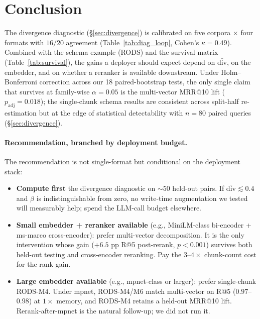 \documentclass[11pt]{article}
\begin{document}
\section{Conclusion}
\label{sec:conclusion}

The divergence diagnostic (\S\ref{sec:divergence}) is calibrated on
five corpora $\times$ four formats with $16/20$ agreement
(Table~\ref{tab:diag_loop}, Cohen's $\kappa{=}0.49$). Combined with
the schema example (RODS) and the survival matrix
(Table~\ref{tab:survival}), the gains a deployer should expect
depend on $\bar{\mathrm{div}}$, on the embedder, and on whether a
reranker is available downstream. Under Holm--Bonferroni correction
across our 18 paired-bootstrap tests, the only single claim that
survives at family-wise $\alpha=0.05$ is the multi-vector MRR@10
lift ($p_{\text{adj}}=0.018$); the single-chunk schema results are
consistent across split-half re-estimation but at the edge of
statistical detectability with $n{=}80$ paired queries
(\S\ref{sec:divergence}).

\paragraph{Recommendation, branched by deployment budget.} The
recommendation is not single-format but conditional on the
deployment stack:

\begin{itemize}[noitemsep,topsep=0.3em]
\item \textbf{Compute first} the divergence diagnostic on $\sim 50$
      held-out pairs. If $\bar{\mathrm{div}} \lesssim 0.4$ and
      $\beta$ is indistinguishable from zero, no write-time
      augmentation we tested will measurably help; spend the
      LLM-call budget elsewhere.
\item \textbf{Small embedder + reranker available} (e.g., MiniLM-class
      bi-encoder + ms-marco cross-encoder): prefer multi-vector
      decomposition. It is the only intervention whose gain
      ($+6.5$ pp R@5 post-rerank, $p{<}0.001$) survives both
      held-out testing and cross-encoder reranking. Pay the
      $3$--$4{\times}$ chunk-count cost for the rank gain.
\item \textbf{Large embedder available} (e.g., mpnet-class or larger):
      prefer single-chunk RODS-M4. Under mpnet, RODS-M4/M6 match
      multi-vector on R@5 ($0.97$--$0.98$) at $1{\times}$ memory,
      and RODS-M4 retains a held-out MRR@10 lift. Rerank-after-mpnet
      is the natural follow-up; we did not run it.
\end{itemize}
\end{document}
